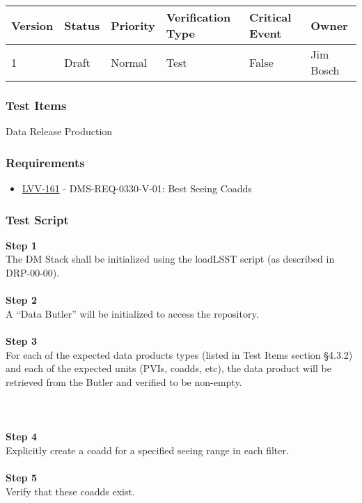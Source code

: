 \begin{longtable}[]{@{}llllll@{}}
\toprule
Version & Status & Priority & Verification Type & Critical Event &
Owner\tabularnewline
\midrule
\endhead
1 & Draft & Normal & Test & False & Jim Bosch\tabularnewline
\bottomrule
\end{longtable}

\hypertarget{test-items-53}{%
\subsubsection{Test Items}\label{test-items-53}}

Data Release Production

\hypertarget{requirements-54}{%
\subsubsection{Requirements}\label{requirements-54}}

\begin{itemize}
\tightlist
\item
  \href{https://jira.lsstcorp.org/browse/LVV-161}{LVV-161} -
  DMS-REQ-0330-V-01: Best Seeing Coadds
\end{itemize}

\hypertarget{test-script-54}{%
\subsubsection{Test Script}\label{test-script-54}}

\textbf{Step 1}\\
The DM Stack shall be initialized using the loadLSST script (as
described in DRP-00-00).\\
~\\
\textbf{Step 2}\\
A ``Data Butler'' will be initialized to access the repository.\\
~\\
\textbf{Step 3}\\
For each of the expected data products types (listed in Test Items
section §4.3.2) and each of the expected units (PVIs, coadds, etc), the
data product will be retrieved from the Butler and verified to be
non-empty.\\
~\\
~\\
~\\
\textbf{Step 4}\\
Explicitly create a coadd for a specified seeing range in each filter.\\
~\\
\textbf{Step 5}\\
Verify that these coadds exist.\\
~\\

